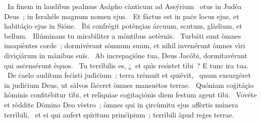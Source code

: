 {~In finem in laudibus psalmus Asápho cànticum ad Assýrium}
{%
~otus in Judéa Deus~; in Israhéle magnum nomen ejus.
~Et fàctus est in paċe locus ejus, et habitáçio ejus in Sióne.
~Ìbi confrégit potènçias árcuum, scutum, glàdium, et bellum.
~Illúminans tu mirabìliter a mòntibus aetèrnïs.
~Turbáti sunt òmnes insapièntes corde~; dormivérunt sòmnum suum, et nìhil invenérunt òmnes vìri diviçiárum in mànibus suïs.
~Ab increpaçióne tua, Deus Jacóbi, dormitavérunt qui asċensérunt èquos.
~Tu terrìbilis es, ¿~et quìs resìstet tìbi~? E tunc ira tua.
~De ċaelo audítum feċìsti judìċium~; terra trémuit et quiévit,
~quum exsurgéret in judìċium Deus, ut sàlvos fàċeret òmnes mansuétos terrae.
~Quóniam coġitáçio hòminis confitébitur tìbi, et relìquiae coġitaçiónis diem festum agent tìbi.
~Vovéte et rèddite Dòmino Deo vèstro~; òmnes qui in çircùmitu ejus affèrtis múnera terrìbili,
~et ei qui aufert spíritum prinċìpium~; terrìbili àpud reġes terrae.}
